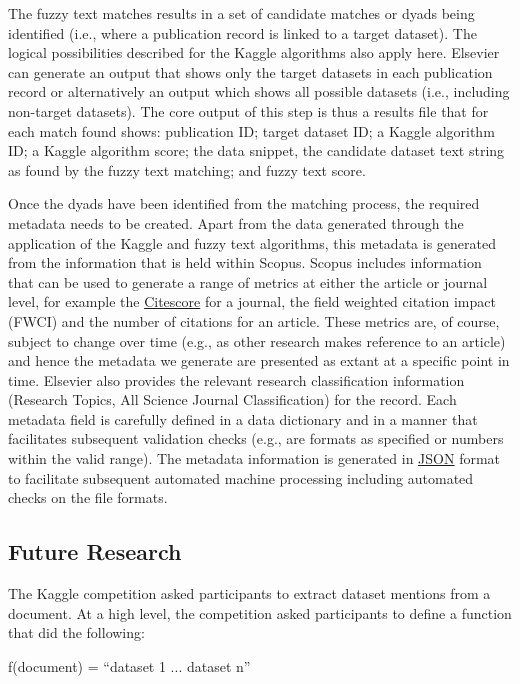 \documentclass[titlepage, 11pt]{article}
\begin{document}
{The fuzzy text matches results in a set of candidate matches or dyads being identified (i.e., where a publication record is linked to a target dataset). The logical possibilities described for the Kaggle algorithms also apply here. Elsevier can generate an output that shows only the target datasets in each publication record or alternatively an output which shows all possible datasets (i.e., including non-target datasets). The core output of this step is thus a results file that for each match found shows: publication ID; target dataset ID; a Kaggle algorithm ID; a Kaggle algorithm score; the data snippet, the candidate dataset text string as found by the fuzzy text matching; and fuzzy text score.

Once the dyads have been identified from the matching process, the required metadata needs to be created. Apart from the data generated through the application of the Kaggle and fuzzy text algorithms, this metadata is generated from the information that is held within Scopus. Scopus includes information that can be used to generate a range of metrics at either the article or journal level, for example the \href{https://www.elsevier.com/connect/editors-update/citescore-a-new-metric-to-help-you-choose-the-right-journal}{Citescore} for a journal, the field weighted citation impact (FWCI) and the number of citations for an article. These metrics are, of course, subject to change over time (e.g., as other research makes reference to an article) and hence the metadata we generate are presented as extant at a specific point in time. Elsevier also provides the relevant research classification information (Research Topics, All Science Journal Classification) for the record. Each metadata field is carefully defined in a data dictionary and in a manner that facilitates subsequent validation checks (e.g., are formats as specified or numbers within the valid range). The metadata information is generated in \href{https://en.wikipedia.org/wiki/JSON}{JSON} format to facilitate subsequent automated machine processing including automated checks on the file formats.

\subsection{Future Research}
The Kaggle competition asked participants to extract dataset mentions from a document. At a high level, the competition asked participants to define a function that did the following:

f(document) = “dataset 1\textbar\hspace{1pt} ... \textbar\hspace{1pt} dataset n”

}
\end{document}
